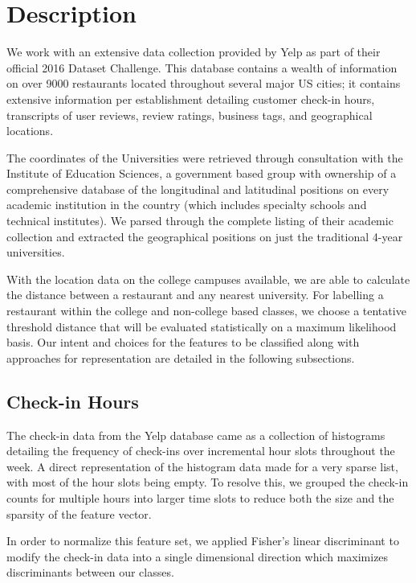 \documentclass[10pt,twocolumn,letterpaper]{article}
\begin{document}
\section{Description}

We work with an extensive data collection provided by Yelp as part of their
official 2016 Dataset Challenge. This database contains a wealth of information
on over 9000 restaurants located throughout several major US cities; it contains
extensive information per establishment detailing  customer check-in hours,
transcripts of user reviews, review ratings, business tags, and geographical
locations.

The coordinates of the Universities were retrieved through consultation with the Institute of Education Sciences, a government based group with ownership of a comprehensive database of the longitudinal and latitudinal positions on every academic institution in the country (which includes specialty schools and technical institutes). We parsed through the complete listing of their academic collection and extracted the geographical positions on just the traditional 4-year universities.

With the location data on the college campuses available, we are able to calculate
the distance between a restaurant and any nearest university. For
labelling a restaurant within the college and non-college based classes, we
choose a tentative threshold distance that will be evaluated statistically on a
maximum likelihood basis. Our intent and choices for the features to be
classified along with approaches for representation are detailed in the
following subsections.

\subsection{Check-in Hours}

The check-in data from the Yelp database came as a collection of histograms
detailing the frequency of check-ins over incremental hour slots throughout the
week. A direct representation of the histogram data made for a very sparse list,
with most of the hour slots being empty. To resolve this, we grouped the
check-in counts for multiple hours into larger time slots to reduce both the
size and the sparsity of the feature vector.

In order to normalize this feature set, we applied Fisher's linear discriminant to modify the check-in data into a single dimensional direction which maximizes discriminants between our classes.
\end{document}
